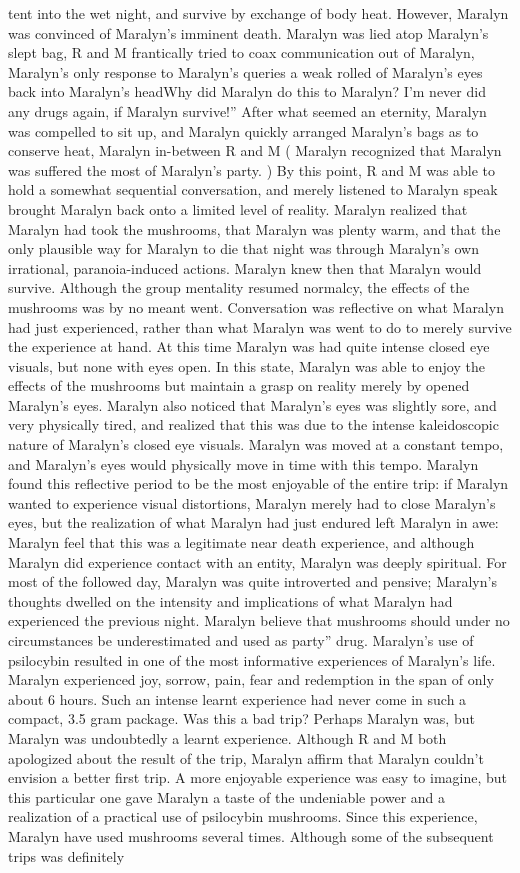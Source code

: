 \documentclass[12pt]{book}
\begin{document}
tent into the wet night, and survive by exchange of body heat. However, Maralyn was convinced of Maralyn's imminent death. Maralyn was lied atop Maralyn's slept bag, R and M frantically tried to coax communication out of Maralyn, Maralyn's only response to Maralyn's queries a weak rolled of Maralyn's eyes back into Maralyn's headWhy did Maralyn do this to Maralyn? I'm never did any drugs again, if Maralyn survive!'' After what seemed an eternity, Maralyn was compelled to sit up, and Maralyn quickly arranged Maralyn's bags as to conserve heat, Maralyn in-between R and M ( Maralyn recognized that Maralyn was suffered the most of Maralyn's party. ) By this point, R and M was able to hold a somewhat sequential conversation, and merely listened to Maralyn speak brought Maralyn back onto a limited level of reality. Maralyn realized that Maralyn had took the mushrooms, that Maralyn was plenty warm, and that the only plausible way for Maralyn to die that night was through Maralyn's own irrational, paranoia-induced actions. Maralyn knew then that Maralyn would survive. Although the group mentality resumed normalcy, the effects of the mushrooms was by no meant went. Conversation was reflective on what Maralyn had just experienced, rather than what Maralyn was went to do to merely survive the experience at hand. At this time Maralyn was had quite intense closed eye visuals, but none with eyes open. In this state, Maralyn was able to enjoy the effects of the mushrooms but maintain a grasp on reality merely by opened Maralyn's eyes. Maralyn also noticed that Maralyn's eyes was slightly sore, and very physically tired, and realized that this was due to the intense kaleidoscopic nature of Maralyn's closed eye visuals. Maralyn was moved at a constant tempo, and Maralyn's eyes would physically move in time with this tempo. Maralyn found this reflective period to be the most enjoyable of the entire trip: if Maralyn wanted to experience visual distortions, Maralyn merely had to close Maralyn's eyes, but the realization of what Maralyn had just endured left Maralyn in awe: Maralyn feel that this was a legitimate near death experience, and although Maralyn did experience contact with an entity, Maralyn was deeply spiritual. For most of the followed day, Maralyn was quite introverted and pensive; Maralyn's thoughts dwelled on the intensity and implications of what Maralyn had experienced the previous night. Maralyn believe that mushrooms should under no circumstances be underestimated and used as party'' drug. Maralyn's use of psilocybin resulted in one of the most informative experiences of Maralyn's life. Maralyn experienced joy, sorrow, pain, fear and redemption in the span of only about 6 hours. Such an intense learnt experience had never come in such a compact, 3.5 gram package. Was this a bad trip? Perhaps Maralyn was, but Maralyn was undoubtedly a learnt experience. Although R and M both apologized about the result of the trip, Maralyn affirm that Maralyn couldn't envision a better first trip. A more enjoyable experience was easy to imagine, but this particular one gave Maralyn a taste of the undeniable power and a realization of a practical use of psilocybin mushrooms. Since this experience, Maralyn have used mushrooms several times. Although some of the subsequent trips was definitely 
\end{document}
